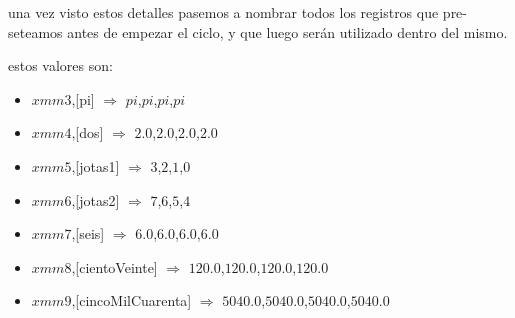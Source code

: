 una vez visto estos detalles pasemos a nombrar todos los registros que pre-seteamos antes de empezar el ciclo, y que luego serán utilizado dentro del mismo.

estos valores son:
\begin{itemize}
	\item $xmm3$,[pi] 				$\Rightarrow$ $pi$,$pi$,$pi$,$pi$
	\item $xmm4$,[dos]				$\Rightarrow$ $2.0$,$2.0$,$2.0$,$2.0$
	\item $xmm5$,[jotas1] 			$\Rightarrow$ $3$,$2$,$1$,$0$
	\item $xmm6$,[jotas2] 			$\Rightarrow$ $7$,$6$,$5$,$4$
	\item $xmm7$,[seis] 			$\Rightarrow$ $6.0$,$6.0$,$6.0$,$6.0$
	\item $xmm8$,[cientoVeinte] 	$\Rightarrow$ $120.0$,$120.0$,$120.0$,$120.0$
	\item $xmm9$,[cincoMilCuarenta] $\Rightarrow$ $5040.0$,$5040.0$,$5040.0$,$5040.0$
\end{itemize}


